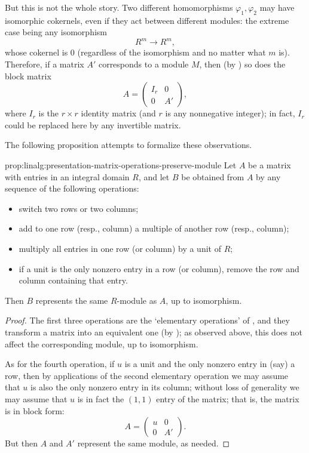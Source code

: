 But this is not the whole story. Two different homomorphisms
$\varphi_1, \varphi_2$ may have isomorphic cokernels, even if they act
between different modules: the extreme case being any isomorphism
\[
  R^m \to R^m,
\]
whose cokernel is $0$ (regardless of the isomorphism and no matter
what $m$ is). Therefore, if a matrix $A'$ corresponds to a module $M$,
then (by ) so does the block matrix
\[
  A = \left(
    \begin{array}{c|c}
      I_r & 0 \\
      \hline
      0 & A'
    \end{array}
  \right),
\]
where $I_r$ is the $r \times r$ identity matrix (and $r$ is any
nonnegative integer); in fact, $I_r$ could be replaced here by any
invertible matrix.

The following proposition attempts to formalize these observations.
\begin{prop}{}{prop:linalg:presentation-matrix-operations-preserve-module}
  Let $A$ be a matrix with entries in an integral domain $R$, and let
  $B$ be obtained from $A$ by any sequence of the following
  operations:
  \begin{itemize}
  \item switch two rows or two columns;
  \item add to one row (resp., column) a multiple of another row
    (resp., column);
  \item multiply all entries in one row (or column) by a unit of $R$;
  \item if a unit is the only nonzero entry in a row (or column),
    remove the row and column containing that entry.
  \end{itemize}
  Then $B$ represents the same $R$-module as $A$, up to isomorphism.
\end{prop}
\begin{proof}
  The first three operations are the `elementary operations' of
  ,
  and they transform a matrix into an equivalent one (by
  ); as observed above, this does not affect the
  corresponding module, up to isomorphism.

  As for the fourth operation, if $u$ is a unit and the only nonzero
  entry in (say) a row, then by applications of the second elementary
  operation we may assume that $u$ is also the only nonzero entry in
  its column; without loss of generality we may assume that $u$ is in
  fact the $(1,1)$ entry of the matrix; that is, the matrix is in
  block form:
  \[
    A = \left(
      \begin{array}{c|c}
        u & 0 \\
        \hline
        0 & A'
      \end{array}
    \right).
  \]
  But then $A$ and $A'$ represent the same module, as needed.
\end{proof}

